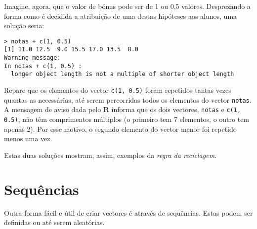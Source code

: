 \documentclass{exam}
\begin{document}
\begin{questions}
\begin{solution}
	Imagine, agora, que o valor de bónus pode ser de 1 ou 0,5 valores. Desprezando a forma como é decidida a atribuição de uma destas hipóteses aos alunos, uma solução seria:
	\begin{verbatim}
> notas + c(1, 0.5)
[1] 11.0 12.5  9.0 15.5 17.0 13.5  8.0
Warning message:
In notas + c(1, 0.5) :
  longer object length is not a multiple of shorter object length
	\end{verbatim}
	Repare que os elementos do vector \texttt{c(1, 0.5)} foram repetidos tantas vezes quantas as necessárias, até serem percorridas todos os elementos do vector \texttt{notas}. A mensagem de aviso dada pelo \textbf{R} informa que os dois vectores, \texttt{notas} e \texttt{c(1, 0.5)}, não têm comprimentos múltiplos (o primeiro tem 7 elementos, o outro tem apenas 2). Por esse motivo, o segundo elemento do vector menor foi repetido menos uma vez.
	
	Estas duas soluções mostram, assim, exemplos da \textit{regra da reciclagem}.
\end{solution}

\end{questions}

\section{Sequências}

Outra forma fácil e útil de criar vectores é através de sequências. Estas podem ser definidas ou até serem aleatórias.
\end{document}
